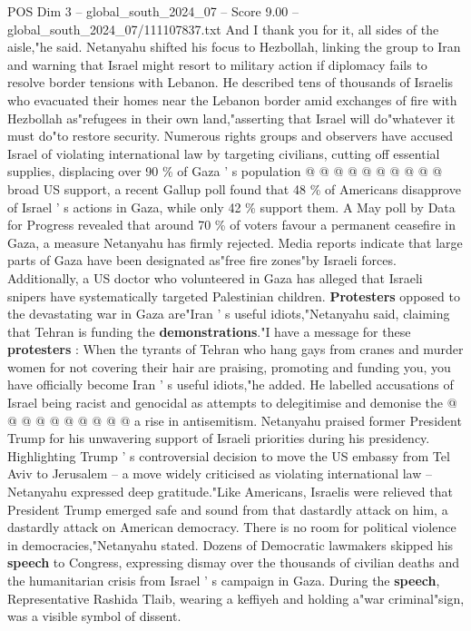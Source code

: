 \begin{textsample}{POS Dim 3 – global\_south\_2024\_07 – Score 9.00 – global\_south\_2024\_07/111107837.txt}
And I thank you for it, all sides of the aisle,"he said.
Netanyahu shifted his focus to Hezbollah, linking the group to Iran and warning that Israel might resort to military action if diplomacy fails to resolve border tensions with Lebanon.
He described tens of thousands of Israelis who evacuated their homes near the Lebanon border amid exchanges of fire with Hezbollah as"refugees in their own land,"asserting that Israel will do"whatever it must do"to restore security.
Numerous rights groups and observers have accused Israel of violating international law by targeting civilians, cutting off essential supplies, displacing over 90 \% of Gaza ' s population @ @ @ @ @ @ @ @ @ @ broad US support, a recent Gallup poll found that 48 \% of Americans disapprove of Israel ' s actions in Gaza, while only 42 \% support them.
A May poll by Data for Progress revealed that around 70 \% of voters favour a permanent ceasefire in Gaza, a measure Netanyahu has firmly rejected.
Media reports indicate that large parts of Gaza have been designated as"free fire zones"by Israeli forces.
Additionally, a US doctor who volunteered in Gaza has alleged that Israeli snipers have systematically targeted Palestinian children. \textbf{Protesters} opposed to the devastating war in Gaza are"Iran ' s useful idiots,"Netanyahu said, claiming that Tehran is funding the \textbf{demonstrations}."I have a message for these \textbf{protesters} : When the tyrants of Tehran who hang gays from cranes and murder women for not covering their hair are praising, promoting and funding you, you have officially become Iran ' s useful idiots,"he added.
He labelled accusations of Israel being racist and genocidal as attempts to delegitimise and demonise the @ @ @ @ @ @ @ @ @ @ a rise in antisemitism.
Netanyahu praised former President Trump for his unwavering support of Israeli priorities during his presidency.
Highlighting Trump ' s controversial decision to move the US embassy from Tel Aviv to Jerusalem -- a move widely criticised as violating international law -- Netanyahu expressed deep gratitude."Like Americans, Israelis were relieved that President Trump emerged safe and sound from that dastardly attack on him, a dastardly attack on American democracy.
There is no room for political violence in democracies,"Netanyahu stated.
Dozens of Democratic lawmakers skipped his \textbf{speech} to Congress, expressing dismay over the thousands of civilian deaths and the humanitarian crisis from Israel ' s campaign in Gaza.
During the \textbf{speech}, Representative Rashida Tlaib, wearing a keffiyeh and holding a"war criminal"sign, was a visible symbol of dissent.

\end{textsample}
